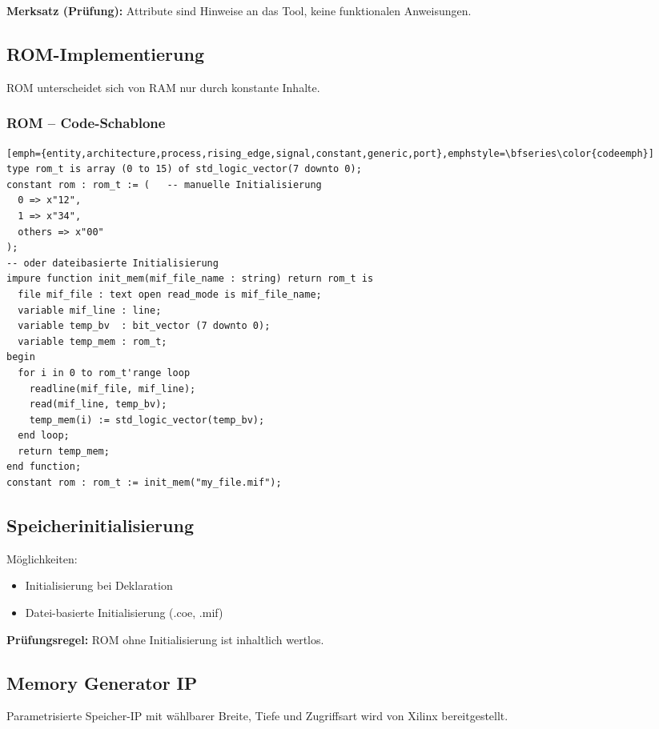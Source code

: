 \documentclass[10pt,a4paper]{article}
\newcommand{\hilite}[1]{\colorbox{yellow!25}{#1}}
\newcommand{\imp}[1]{\textbf{\textcolor{codeemph}{#1}}}
\begin{document}
\begin{multicols}{3}
\imp{Merksatz (Prüfung):}  
\hilite{Attribute} sind \hilite{Hinweise} an das \hilite{Tool}, keine funktionalen Anweisungen.

\subsection{ROM-Implementierung}
ROM unterscheidet sich von RAM nur durch konstante Inhalte.

\subsubsection*{ROM – Code-Schablone}
\begin{lstlisting}[emph={entity,architecture,process,rising_edge,signal,constant,generic,port},emphstyle=\bfseries\color{codeemph}][emph={entity,architecture,process,rising_edge,signal,constant,generic,port},emphstyle=\bfseries\color{codeemph}]
type rom_t is array (0 to 15) of std_logic_vector(7 downto 0);
constant rom : rom_t := (   -- manuelle Initialisierung
  0 => x"12",
  1 => x"34",
  others => x"00"
);
-- oder dateibasierte Initialisierung
impure function init_mem(mif_file_name : string) return rom_t is
  file mif_file : text open read_mode is mif_file_name;
  variable mif_line : line;
  variable temp_bv  : bit_vector (7 downto 0);
  variable temp_mem : rom_t;
begin
  for i in 0 to rom_t'range loop
    readline(mif_file, mif_line);
    read(mif_line, temp_bv);
    temp_mem(i) := std_logic_vector(temp_bv);
  end loop;
  return temp_mem;
end function;
constant rom : rom_t := init_mem("my_file.mif");
\end{lstlisting}

\subsection{Speicherinitialisierung}
Möglichkeiten:
\begin{itemize}
  \item Initialisierung bei Deklaration
  \item Datei-basierte Initialisierung (.coe, .mif)
\end{itemize}

\imp{Prüfungsregel:}  
\hilite{ROM} ohne \hilite{Initialisierung} ist \hilite{inhaltlich} wertlos.

\subsection{Memory Generator IP}
Parametrisierte Speicher-IP mit wählbarer
Breite, Tiefe und Zugriffsart wird von Xilinx bereitgestellt.



\end{multicols}
\end{document}
